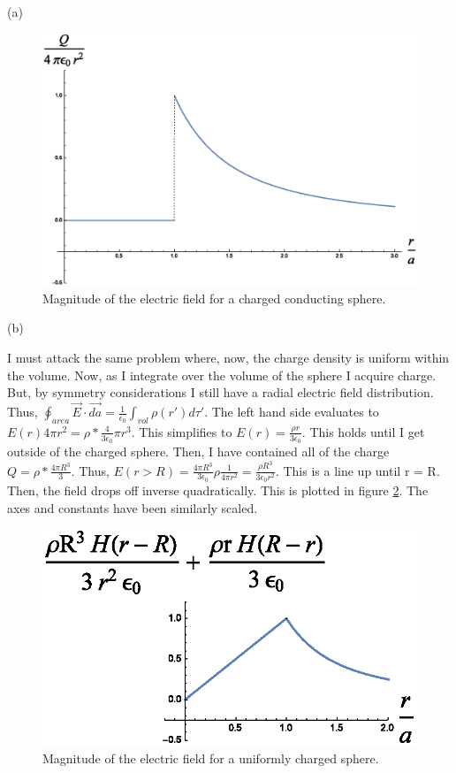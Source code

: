 \begin{homeworkProblem}
\begin{homeworkSection}{(a)}
\begin{figure}%
\centerline{\includegraphics[width=.75\columnwidth,height=.25\paperheight]{./Images/chargedconductor.eps}}%
\caption{Magnitude of the electric field for a charged conducting sphere.}%
\label{chargedconductor}%
\end{figure}

\end{homeworkSection}

\begin{homeworkSection}{(b)}

I must attack the same problem where, now, the charge density is uniform within the volume. Now, as I integrate over the volume of the sphere I acquire charge. But, by symmetry considerations I still have a radial electric field distribution. Thus, $\oint_{area} \vec{E}\cdot \vec{da} = \frac{1}{\epsilon_0} \int_{vol} \rho(r')d\tau'$. The left hand side evaluates to $E(r) 4\pi r^2 = \rho * \frac{4}{3 \epsilon_0}\pi r^3$. This simplifies to $E(r) = \frac{\rho r}{3 \epsilon_0}$. This holds until I get outside of the charged sphere. Then, I have contained all of the charge $Q = \rho * \frac{4\pi R^3}{3}$. Thus, $E(r>R) = \frac{4\pi R^3}{3\epsilon_0} \rho \frac{1}{4\pi r^2} = \frac{\rho R^3}{3\epsilon_0 r^2}$. This is a line up until r = R. Then, the field drops off inverse quadratically. This is plotted in figure \ref{uniformsphere}. The axes and constants have been similarly scaled.

\begin{figure}%
\centerline{\includegraphics[width=.75\columnwidth,height=.25\paperheight]{./Images/uniformsphere.eps}}%
\caption{Magnitude of the electric field for a uniformly charged sphere.}%
\label{uniformsphere}%
\end{figure}


\end{homeworkSection}
\end{homeworkProblem}
